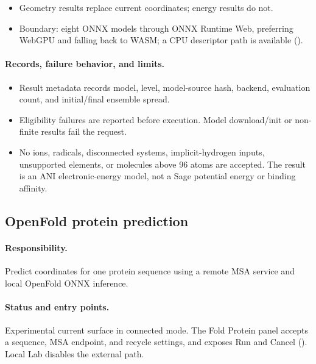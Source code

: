 \documentclass[11pt]{article}
\begin{document}
\begin{small}
\begin{itemize}[leftmargin=*]
\item Geometry results replace current coordinates; energy results do not.

\item Boundary: eight ONNX models through ONNX Runtime Web, preferring WebGPU and falling back to WASM; a CPU descriptor path is available ().

\end{itemize}

\paragraph{Records, failure behavior, and limits.}

\begin{itemize}[leftmargin=*]

\item Result metadata records model, level, model-source hash, backend, evaluation count, and initial/final ensemble spread.

\item Eligibility failures are reported before execution. Model download/init or non-finite results fail the request.

\item No ions, radicals, disconnected systems, implicit-hydrogen inputs, unsupported elements, or molecules above 96 atoms are accepted. The result is an ANI electronic-energy model, not a Sage potential energy or binding affinity.

\end{itemize}

\subsection{OpenFold protein prediction}\label{appB:sec15}

\paragraph{Responsibility.}

Predict coordinates for one protein sequence using a remote MSA service and local OpenFold ONNX inference.

\paragraph{Status and entry points.}

Experimental current surface in connected mode. The Fold Protein panel accepts a sequence, MSA endpoint, and recycle settings, and exposes Run and Cancel (). Local Lab disables the external path.


\end{small}
\end{document}
